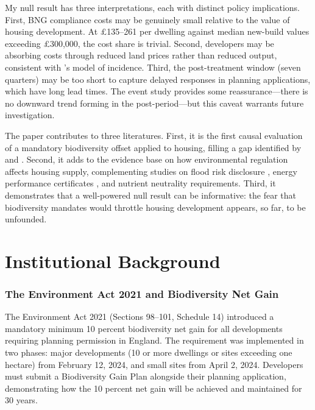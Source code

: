 \documentclass[12pt]{article}
\begin{document}
My null result has three interpretations, each with distinct policy implications. First, BNG compliance costs may be genuinely small relative to the value of housing development. At \pounds135--261 per dwelling against median new-build values exceeding \pounds300,000, the cost share is trivial. Second, developers may be absorbing costs through reduced land prices rather than reduced output, consistent with \citet{Glaeser2009}'s model of incidence. Third, the post-treatment window (seven quarters) may be too short to capture delayed responses in planning applications, which have long lead times. The event study provides some reassurance---there is no downward trend forming in the post-period---but this caveat warrants future investigation.

The paper contributes to three literatures. First, it is the first causal evaluation of a mandatory biodiversity offset applied to housing, filling a gap identified by \citet{Bull2013} and \citet{Maron2016}. Second, it adds to the evidence base on how environmental regulation affects housing supply, complementing studies on flood risk disclosure \citep{Bernstein2019}, energy performance certificates \citep{Fuerst2015}, and nutrient neutrality requirements. Third, it demonstrates that a well-powered null result can be informative: the fear that biodiversity mandates would throttle housing development appears, so far, to be unfounded.

\section{Institutional Background}

\subsubsection*{The Environment Act 2021 and Biodiversity Net Gain} The Environment Act 2021 (Sections 98--101, Schedule 14) introduced a mandatory minimum 10 percent biodiversity net gain for all developments requiring planning permission in England. The requirement was implemented in two phases: major developments (10 or more dwellings or sites exceeding one hectare) from February 12, 2024, and small sites from April 2, 2024. Developers must submit a Biodiversity Gain Plan alongside their planning application, demonstrating how the 10 percent net gain will be achieved and maintained for 30 years.
\end{document}
